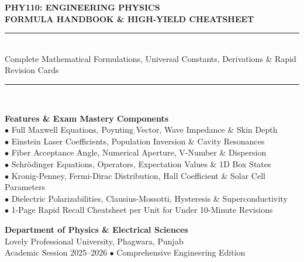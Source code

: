 \begin{titlepage}
\begin{center}
\vspace*{1.5cm}

{\Huge\bfseries\color{LPUNavy} PHY110: ENGINEERING PHYSICS}\\[0.5cm]
{\LARGE\bfseries\color{LPUOrange} FORMULA HANDBOOK \& HIGH-YIELD CHEATSHEET}\\[1cm]

\rule{\textwidth}{1.5pt}\\[0.6cm]
{\Large\color{DarkSlate} Complete Mathematical Formulations, Universal Constants, Derivations \& Rapid Revision Cards}\\[0.6cm]
\rule{\textwidth}{1.5pt}\\[2cm]

\begin{tcolorbox}[colback=white,colframe=LPUNavy,arc=3mm,width=0.85\textwidth]
\centering
\textbf{\large Features \& Exam Mastery Components}\\[3mm]
\small
$\bullet$ Full Maxwell Equations, Poynting Vector, Wave Impedance \& Skin Depth\\
$\bullet$ Einstein Laser Coefficients, Population Inversion \& Cavity Resonances\\
$\bullet$ Fiber Acceptance Angle, Numerical Aperture, V-Number \& Dispersion\\
$\bullet$ Schr\"odinger Equations, Operators, Expectation Values \& 1D Box States\\
$\bullet$ Kronig-Penney, Fermi-Dirac Distribution, Hall Coefficient \& Solar Cell Parameters\\
$\bullet$ Dielectric Polarizabilities, Clausius-Mossotti, Hysteresis \& Superconductivity\\
$\bullet$ 1-Page Rapid Recall Cheatsheet per Unit for Under 10-Minute Revisions
\end{tcolorbox}

\vfill
{\large\bfseries Department of Physics \& Electrical Sciences}\\[0.2cm]
{\large Lovely Professional University, Phagwara, Punjab}\\[0.5cm]
{\small Academic Session 2025--2026 $\bullet$ Comprehensive Engineering Edition}

\end{center}
\end{titlepage}
